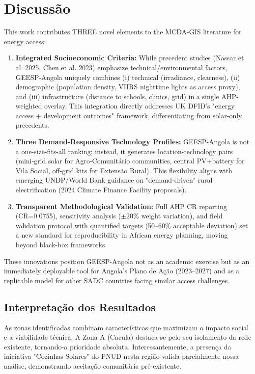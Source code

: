 \documentclass[12pt, a4paper]{article}
\begin{document}
{{{{{{{{{{{{%
\section{Discussão}
This work contributes THREE novel elements to the MCDA-GIS literature for energy access:

\begin{enumerate}
  \item \textbf{Integrated Socioeconomic Criteria:} While precedent studies (Nassar et al. 2025, Chen et al. 2023) emphasize technical/environmental factors, GEESP-Angola uniquely combines (i) technical (irradiance, clearness), (ii) demographic (population density, VIIRS nighttime lights as access proxy), and (iii) infrastructure (distance to schools, clinics, grid) in a single AHP-weighted overlay. This integration directly addresses UK DFID's "energy access + development outcomes" framework, differentiating from solar-only precedents.
  \item \textbf{Three Demand-Responsive Technology Profiles:} GEESP-Angola is not a one-size-fits-all ranking; instead, it generates location-technology pairs (mini-grid solar for Agro-Comunitário communities, central PV+battery for Vila Social, off-grid kits for Extensão Rural). This flexibility aligns with emerging UNDP/World Bank guidance on "demand-driven" rural electrification (2024 Climate Finance Facility proposals).
  \item \textbf{Transparent Methodological Validation:} Full AHP CR reporting (CR=0.0755), sensitivity analysis ($\pm 20\%$ weight variation), and field validation protocol with quantified targets (50--60\% acceptable deviation) set a new standard for reproducibility in African energy planning, moving beyond black-box frameworks.
\end{enumerate}

These innovations position GEESP-Angola not as an academic exercise but as an immediately deployable tool for Angola's Plano de Ação (2023--2027) and as a replicable model for other SADC countries facing similar access challenges.
\subsection{Interpretação dos Resultados}

As zonas identificadas combinam características que maximizam o impacto social e a viabilidade técnica. A Zona A (Cacula) destaca-se pelo seu isolamento da rede existente, tornando-a prioridade absoluta. Interessantemente, a presença da iniciativa "Cozinhas Solares" do PNUD nesta região valida parcialmente nossa análise, demonstrando aceitação comunitária pré-existente.

}}}}}}}}}}}}
\end{document}
